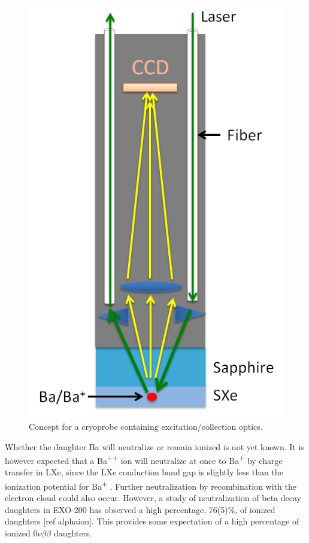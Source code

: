 \begin{figure} %
	\centering
	\includegraphics[width=.5\textwidth]{figures/probe_flat.png}
	\caption{Concept for a cryoprobe containing excitation/collection optics.}
\label{fig:probe}
\end{figure}

Whether the daughter Ba will neutralize or remain ionized is not yet known.  It is however expected that a Ba\textsuperscript{++} ion will neutralize at once to Ba\textsuperscript{+} by charge transfer in LXe, since the LXe conduction band gap is slightly less than the ionization potential for Ba\textsuperscript{+} \cite{Moe1991}.  Further neutralization by recombination with the electron cloud could also occur.  However, a study of neutralization of beta decay daughters in EXO-200 has observed a high percentage, 76(5)\%, of ionized daughters [ref alphaion].  This provides some expectation of a high percentage of ionized $0\nu\beta\beta$ daughters.

